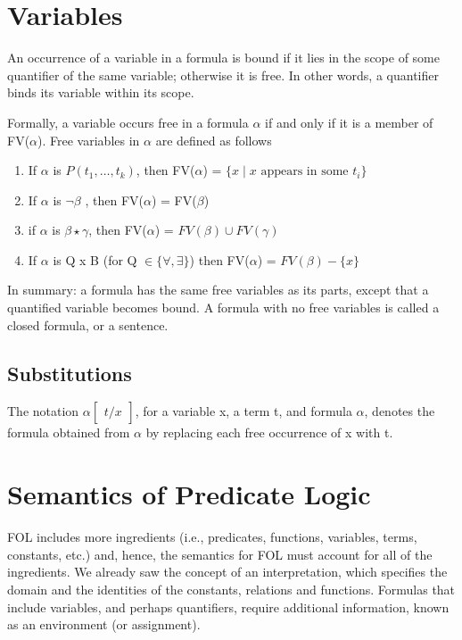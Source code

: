 \documentclass{article}
\newenvironment{cblock}[1]{%
    \tcolorbox[beamer,%
    noparskip,breakable,
    colback=lightblue,colframe=darkblue,%
    colbacklower=darkblue!75!lightblue,%
    title=#1]}%
    {\endtcolorbox}
\begin{document}
\section{Variables}
An occurrence of a variable in a formula is bound if it lies in the scope of some quantifier of the same variable; otherwise it is free. In other words, a quantifier binds its variable within its scope.

Formally, a variable occurs free in a formula \(\alpha\) if and only if it is a member of FV(\(\alpha\)). Free variables in \(\alpha\) are defined as follows 
\begin{enumerate}
\item If \(\alpha\) is \(P(t_1, \ldots, t_k)\), then FV(\(\alpha\)) = \(\{x \mid x \text{ appears in some } t_i \}\) 
\item If \(\alpha\) is \( \neg \beta\) , then FV(\(\alpha\)) = FV(\(\beta\))
\item if \(\alpha\) is \(\beta \star \gamma\), then FV(\(\alpha\)) = \(FV(\beta) \cup FV(\gamma)\)
\item If \(\alpha\) is Q x B (for Q \(\in \{\forall, \exists\}\)) then FV(\(\alpha\)) = \(FV(\beta) - \{x\}\)
\end{enumerate}

In summary: a formula has the same free variables as its parts, except that a quantified variable becomes bound.
A formula with no free variables is called a closed formula, or a sentence.

\subsection{Substitutions}
The notation \(\alpha \begin{bmatrix}
t / x
\end{bmatrix}\), for a variable x, a term t, and formula \(\alpha\), denotes the formula obtained from \(\alpha\) by replacing each free occurrence of x with t. 

\section{Semantics of Predicate Logic}


\begin{cblock}{From Kevin's Slides}
FOL includes more ingredients (i.e., predicates, functions, variables, terms, constants, etc.) and, hence, the semantics for FOL must account for all of the ingredients.
We already saw the concept of an interpretation, which specifies the domain and the identities of the constants, relations and functions.
Formulas that include variables, and perhaps quantifiers, require additional information, known as an environment (or assignment).
\end{cblock}
\end{document}
